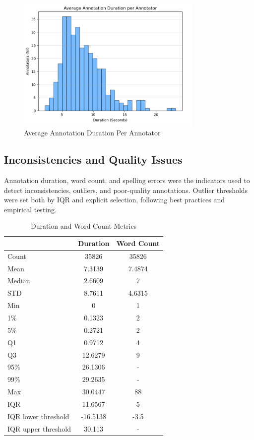 \documentclass{article}
\begin{document}
\begin{figure}[ht]
  \centering
  \includegraphics[width=0.8\textwidth]{figures/annotation_quality/average_annotation_duration_per_annotator.png}
  \caption{Average Annotation Duration Per Annotator}
  \label{fig:avg_duration}
\end{figure}

\subsection{Inconsistencies and Quality Issues}

Annotation duration, word count, and spelling errors were the indicators used to detect inconsistencies, outliers, and poor-quality annotations. Outlier thresholds were set both by IQR and explicit selection, following best practices and empirical testing.

\begin{table}[ht]
  \caption{Duration and Word Count Metrics}
  \label{tab:duration_word}
  \centering
  \begin{tabular}{lcc}
    \toprule
    & Duration & Word Count \\
    \midrule
    Count & 35826 & 35826 \\
    Mean & 7.3139 & 7.4874 \\
    Median & 2.6609 & 7 \\
    STD & 8.7611 & 4.6315 \\
    Min & 0 & 1 \\
    1\% & 0.1323 & 2 \\
    5\% & 0.2721 & 2 \\
    Q1 & 0.9712 & 4 \\
    Q3 & 12.6279 & 9 \\
    95\% & 26.1306 & - \\
    99\% & 29.2635 & - \\
    Max & 30.0447 & 88 \\
    IQR & 11.6567 & 5 \\
    IQR lower threshold & -16.5138 & -3.5 \\
    IQR upper threshold & 30.113 & - \\
    \bottomrule
  \end{tabular}
\end{table}
\end{document}
